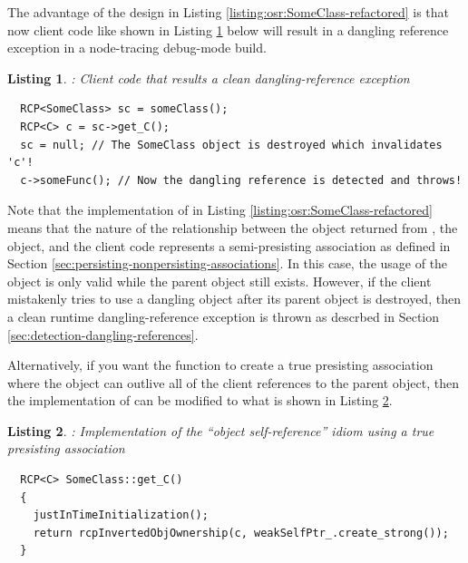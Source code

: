 \documentclass[pdf,ps2pdf,11pt]{SANDreport}
\newtheorem{listing}{Listing}
\begin{document}
The advantage of the design in Listing
{}\ref{listing:osr:SomeClass-refactored} is that now client code like
shown in Listing {}\ref{listing:osr:dangling-ref-SomeClass} below will
result in a dangling reference exception in a node-tracing debug-mode
build.


\begin{listing}: Client code that results a clean dangling-reference exception  \\
\label{listing:osr:dangling-ref-SomeClass}
{\small\begin{verbatim}
  RCP<SomeClass> sc = someClass();
  RCP<C> c = sc->get_C();
  sc = null; // The SomeClass object is destroyed which invalidates 'c'!
  c->someFunc(); // Now the dangling reference is detected and throws!
\end{verbatim}}
\end{listing}


Note that the implementation of {} in Listing
{}\ref{listing:osr:SomeClass-refactored} means that the nature of the
relationship between the {} object returned from
{}, the {} object, and the
client code represents a semi-presisting association as defined in
Section {}\ref{sec:persisting-nonpersisting-associations}.  In this
case, the usage of the {} object is only valid while the parent
{} object still exists.  However, if the client
mistakenly tries to use a dangling {} object after its parent
{} object is destroyed, then a clean runtime
dangling-reference exception is thrown as descrbed in Section
{}\ref{sec:detection-dangling-references}.

Alternatively, if you want the {} function
to create a true presisting association where the {} object
can outlive all of the client references to the parent
{} object, then the implementation of
{} can be modified to what is shown in
Listing {}\ref{listing:osr:SomeClass-get_C-persisting}.


\begin{listing}:  Implementation of the ``object self-reference'' idiom
using a true presisting association  \\
\label{listing:osr:SomeClass-get_C-persisting}
{\small\begin{verbatim}
  RCP<C> SomeClass::get_C()
  {
    justInTimeInitialization();
    return rcpInvertedObjOwnership(c, weakSelfPtr_.create_strong());
  }
\end{verbatim}}
\end{listing}
\end{document}

